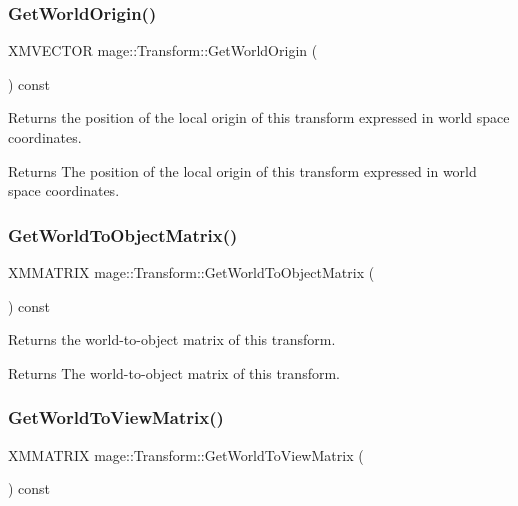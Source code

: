 \subsubsection{\texorpdfstring{Get\+World\+Origin()}{GetWorldOrigin()}}
{\footnotesize\ttfamily X\+M\+V\+E\+C\+T\+OR mage\+::\+Transform\+::\+Get\+World\+Origin (\begin{DoxyParamCaption}{ }\end{DoxyParamCaption}) const}

Returns the position of the local origin of this transform expressed in world space coordinates.

\begin{DoxyReturn}{Returns}
The position of the local origin of this transform expressed in world space coordinates. 
\end{DoxyReturn}
\hypertarget{structmage_1_1_transform_a773c1db9e475deb6d9f446a88cfae30f}{}\label{structmage_1_1_transform_a773c1db9e475deb6d9f446a88cfae30f} 
\subsubsection{\texorpdfstring{Get\+World\+To\+Object\+Matrix()}{GetWorldToObjectMatrix()}}
{\footnotesize\ttfamily X\+M\+M\+A\+T\+R\+IX mage\+::\+Transform\+::\+Get\+World\+To\+Object\+Matrix (\begin{DoxyParamCaption}{ }\end{DoxyParamCaption}) const}

Returns the world-\/to-\/object matrix of this transform.

\begin{DoxyReturn}{Returns}
The world-\/to-\/object matrix of this transform. 
\end{DoxyReturn}
\hypertarget{structmage_1_1_transform_a33cc590d779f69044d183bab653bd260}{}\label{structmage_1_1_transform_a33cc590d779f69044d183bab653bd260} 
\subsubsection{\texorpdfstring{Get\+World\+To\+View\+Matrix()}{GetWorldToViewMatrix()}}
{\footnotesize\ttfamily X\+M\+M\+A\+T\+R\+IX mage\+::\+Transform\+::\+Get\+World\+To\+View\+Matrix (\begin{DoxyParamCaption}{ }\end{DoxyParamCaption}) const}

